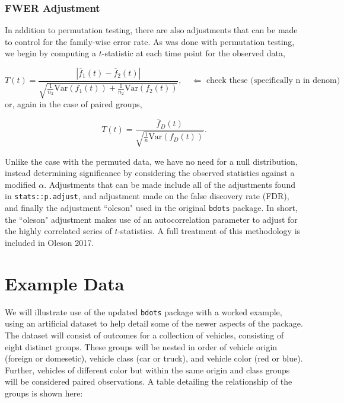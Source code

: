 \documentclass{article}
\newcommand{\xt}{\texttt}%
\begin{document}
\subsubsection{FWER Adjustment}

In addition to permutation testing, there are also adjustments that can be made to control for the family-wise error rate. As was done with permutation testing, we begin by computing a $t$-statistic at each time point for the observed data, 

\begin{equation}
T(t) = \frac{|\overline{f}_1(t) - \overline{f}_2(t)|}{\sqrt{\frac{1}{n_2} \text{Var}(f_1(t)) + \frac{1}{n_2} \text{Var}(f_2(t))}}, \quad \Leftarrow \text{ check these (specifically n in denom)}
\end{equation}
or, again in the case of paired groups, 

\begin{equation}
T(t) = \frac{\overline{f}_D(t)}{\sqrt{\frac1n \text{Var}(f_D(t))}}.
\end{equation}

Unlike the case with the permuted data, we have no need for a null distribution, instead determining significance by considering the observed statistics against a modified $\alpha$.  Adjustments that can be made include all of the adjustments found in \xt{stats::p.adjust}, and adjustment made on the false discovery rate (FDR), and finally the adjustment ``oleson" used in the original \xt{bdots} package. In short, the ``oleson" adjustment makes use of an autocorrelation parameter to adjust for the highly correlated series of $t$-statistics. A full treatment of this methodology is included in Oleson 2017.




\section{Example Data}

We will illustrate use of the updated \xt{bdots} package with a worked example, using an artificial dataset to help detail some of the newer aspects of the package. The dataset will consist of outcomes for a collection of vehicles, consisting of eight distinct groups. These groups will be nested in order of vehicle origin (foreign or domesetic), vehicle class (car or truck), and vehicle color (red or blue). Further, vehicles of different color but within the same origin and class groups will be considered paired observations. A table detailing the relationship of the groups is shown here:
\end{document}
